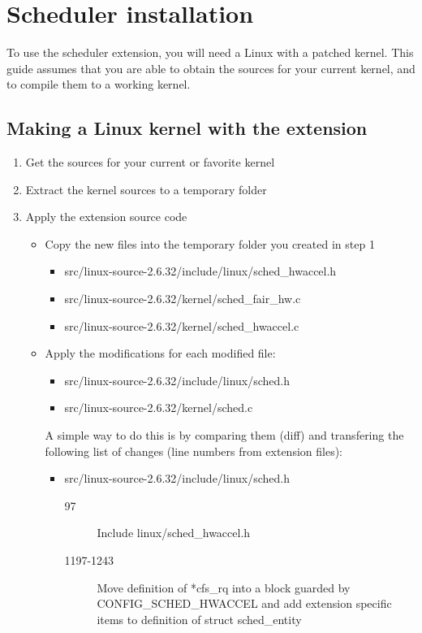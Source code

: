 \section{Scheduler installation}
\label{ExtendKernel}

To use the scheduler extension, you will need a Linux with a patched kernel. This guide assumes that you are able to obtain the sources for your current kernel, and to compile them to a working kernel.

\subsection{Making a Linux kernel with the extension}
\begin{enumerate}
	\item Get the sources for your current or favorite kernel
	\item Extract the kernel sources to a temporary folder
	\item Apply the extension source code\\
		\begin{itemize}
			\item Copy the new files into the temporary folder you created in step 1
				\begin{itemize}
					\item src/linux-source-2.6.32/include/linux/sched\_hwaccel.h
					\item src/linux-source-2.6.32/kernel/sched\_fair\_hw.c
					\item src/linux-source-2.6.32/kernel/sched\_hwaccel.c
				\end{itemize}
			\item Apply the modifications for each modified file:
				\begin{itemize}
					\item src/linux-source-2.6.32/include/linux/sched.h
					\item src/linux-source-2.6.32/kernel/sched.c
				\end{itemize}
				A simple way to do this is by comparing them (diff) and transfering the following list of changes (line numbers from extension files):
				\begin{itemize}
					\item src/linux-source-2.6.32/include/linux/sched.h
						\begin{description}
							\item[97] Include linux/sched\_hwaccel.h
							\item[1197-1243] Move definition of *cfs\_rq into a block guarded by CONFIG\_SCHED\_HWACCEL and add extension specific items to definition of struct sched\_entity

\end{description}
\end{itemize}
\end{itemize}
\end{enumerate}
